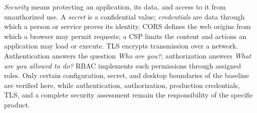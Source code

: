\begin{beginnerstatement}

\emph{Security} means protecting an application, its data, and access to it
from unauthorized use. A \emph{secret} is a confidential value;
\emph{credentials} are data through which a person or service proves its
identity. CORS defines the web origins from which a browser may permit
requests; a CSP limits the content and actions an application may load or
execute. TLS encrypts transmission over a network. Authentication answers the
question \emph{Who are you?}; authorization answers \emph{What are you allowed
to do?} RBAC implements such permissions through assigned roles. Only certain
configuration, secret, and desktop boundaries of the baseline are verified
here, while authentication, authorization, production credentials, TLS, and a
complete security assessment remain the responsibility of the specific
product.

\end{beginnerstatement}
